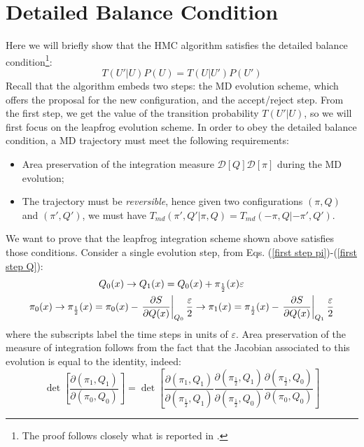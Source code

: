 \chapter{Detailed Balance Condition}
\label{app:a}
Here we will briefly show that the HMC algorithm satisfies the detailed balance condition\footnote{The proof follows closely what is reported in \cite{Gattringer:2010zz}.}:
\begin{equation}
    T(U'|U) P(U) = T(U|U') P(U')
\end{equation}
Recall that the algorithm embeds two steps: the MD evolution scheme, which offers the proposal for the new configuration, and the accept/reject step. From the first step, we get the value of the transition probability $T(U'|U)$, so we will first focus on the leapfrog evolution scheme. In order to obey the detailed balance condition, a MD trajectory must meet the following requirements:
\begin{itemize}
    \item Area preservation of the integration measure $\mathcal{D}[Q]\mathcal{D}[\pi]$ during the MD evolution;
    \item The trajectory must be \textit{reversible}, hence given two configurations $(\pi,Q)$ and $(\pi', Q')$, we must have $T_{md}(\pi', Q' | \pi, Q) = T_{md}(-\pi, Q| -\pi', Q')$.
\end{itemize}
We want to prove that the leapfrog integration scheme shown above satisfies those conditions. Consider a single evolution step, from Eqs. (\ref{first step pi})-(\ref{first step Q}):
\begin{equation}\label{evolution step}
    \begin{split}
    & \hspace{25mm} Q_0(x) \to Q_1(x) = Q_0(x) + \pi_{\frac{1}{2}}(x) \varepsilon \\
       & \pi_{0}(x) \to \pi_{\frac{1}{2}}(x) =  \pi_{0}(x) - \left. \pdv{S}{Q(x)} \right\rvert_{Q_{0}} \frac{\varepsilon}{2} \to \pi_{1}(x) = \pi_{\frac{1}{2}}(x) - \left. \pdv{S}{Q(x)} \right\rvert_{Q_{1}} \frac{\varepsilon}{2} 
    \end{split}
\end{equation}
where the subscripts label the time steps in units of $\varepsilon$. Area preservation of the measure of integration follows from the fact that the Jacobian associated to this evolution is equal to the identity, indeed:
\begin{equation}
    \det[\frac{\partial(\pi_1, Q_1)}{\partial(\pi_0, Q_0)}] = \det[\frac{\partial(\pi_1, Q_1)}{\partial(\pi_{\frac{1}{2}}, Q_1)}\frac{\partial(\pi_{\frac{1}{2}}, Q_1)}{\partial(\pi_{\frac{1}{2}}, Q_0)}\frac{\partial(\pi_{\frac{1}{2}}, Q_0)}{\partial(\pi_0, Q_0)}]
\end{equation}
